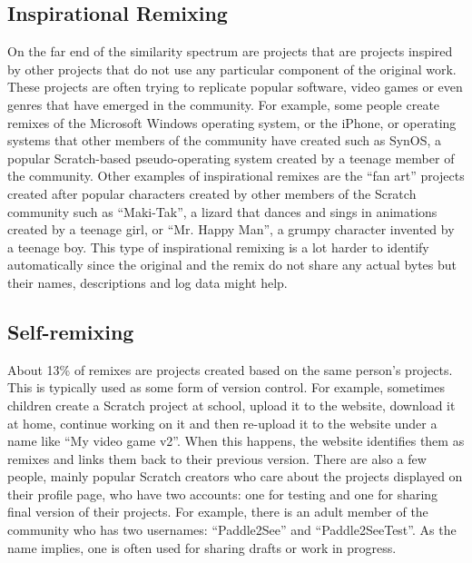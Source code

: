 \subsection{Inspirational Remixing}
On the far end of the similarity spectrum are projects that are projects inspired by other projects that do not use any particular component of the original work.
These projects are often trying to replicate popular software, video games or even genres that have emerged in the community.
For example, some people create remixes of the Microsoft Windows operating system, or the iPhone, or operating systems that other members of the community have created such as SynOS, a popular Scratch-based pseudo-operating system created by a teenage member of the community.
Other examples of inspirational remixes are the ``fan art'' projects created after popular characters created by other members of the Scratch community such as ``Maki-Tak'', a lizard that dances and sings in animations created by a teenage girl,  or  ``Mr. Happy Man'', a grumpy character invented by a teenage boy.
This type of inspirational remixing is a lot harder to identify automatically since the original and the remix do not share any actual bytes but their names, descriptions and log data might help. 

\subsection{Self-remixing}
About 13\% of remixes are projects created based on the same person's projects.
This is typically used as some form of version control.
For example, sometimes children create a Scratch project at school, upload it to the website, download it at home, continue working on it and then re-upload it to the website under a name like ``My video game v2''.
When this happens, the website identifies them as remixes and links them back to their previous version.
There are also a few people, mainly popular Scratch creators who care about the projects displayed on their profile page, who have two accounts: one for testing and one for sharing final version of their projects.
For example, there is an adult member of the community who has two usernames: ``Paddle2See'' and ``Paddle2SeeTest''.
As the name implies, one is often used for sharing drafts or work in progress.
 
